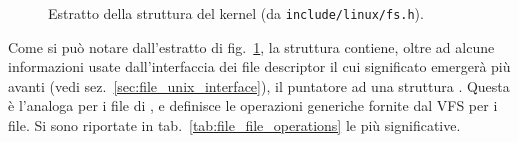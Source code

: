 
\begin{figure}[!htb]
  \footnotesize \centering
  \begin{minipage}[c]{0.8\textwidth}
  \end{minipage}
  \normalsize 
  \caption{Estratto della struttura  del kernel (da
    \texttt{include/linux/fs.h}).}
  \label{fig:kstruct_file}
\end{figure}

Come si può notare dall'estratto di fig.~\ref{fig:kstruct_file}, la struttura
 contiene, oltre ad alcune informazioni usate dall'interfaccia
dei file descriptor il cui significato emergerà più avanti (vedi
sez.~\ref{sec:file_unix_interface}), il puntatore  ad una struttura
. Questa è l'analoga per i file di
, e definisce le operazioni generiche fornite dal
VFS per i file. Si sono riportate in tab.~\ref{tab:file_file_operations} le
più significative.

